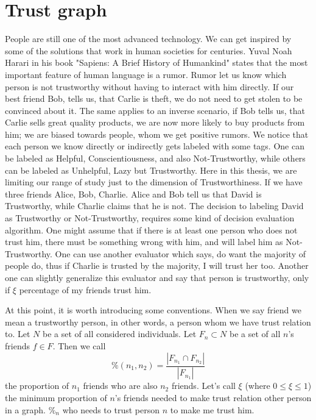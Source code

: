 \chapter{Trust graph}
\label{trust-graph}

People are still one of the most advanced technology. We can get inspired by some of the solutions that work in human societies for centuries.
Yuval Noah Harari in his book "Sapiens: A Brief History of Humankind" \cite{harari2014sapiens} states that the most important feature of human language is a rumor. Rumor let us know which person is not trustworthy without having to interact with him directly. If our best friend Bob, tells us, that Carlie is theft, we do not need to get stolen to be convinced about it. The same applies to an inverse scenario, if Bob tells us, that Carlie sells great quality products, we are now more likely to buy products from him; we are biased towards people, whom we get positive rumors. We notice that each person we know directly or indirectly gets labeled with some tags. One can be labeled as Helpful, Conscientiousness, and also Not-Trustworthy, while others can be labeled as Unhelpful, Lazy but Trustworthy. Here in this thesis, we are limiting our range of study just to the dimension of Trustworthiness.
If we have three friends Alice, Bob, Charlie. Alice and  Bob tell us that David is Trustworthy, while Charlie claims that he is not. The decision to labeling David as Trustworthy or Not-Trustworthy, requires some kind of decision evaluation algorithm.
One might assume that if there is at least one person who does not trust him, there must be something wrong with him, and will label him as Not-Trustworthy. One can use another evaluator which says, do want the majority of people do, thus if Charlie is trusted by the majority, I will trust her too. Another one can slightly generalize this evaluator and say that person is trustworthy, only if $\xi$ percentage of my friends trust him. 

At this point, it is worth introducing some conventions. When we say friend we mean a trustworthy person, in other words, a person whom we have trust relation to. Let $N$ be a set of all considered individuals. Let $F_n \subset N$ be a set of all $n$'s friends $f \in F$. Then we call 
\begin{equation}
\%(n_1, n_2) = \frac{|F_{n_1} \cap F_{n_2}|}{|F_{n_1}|}    
\end{equation}
the proportion of $n_1$ friends who are also $n_2$ friends. Let's call $\xi$ (where $0 \le \xi \leq 1$) the minimum proportion of $n$'s friends needed to make trust relation other person in a graph. $\%_n$ who needs to trust person $n$ to make me trust him. 

